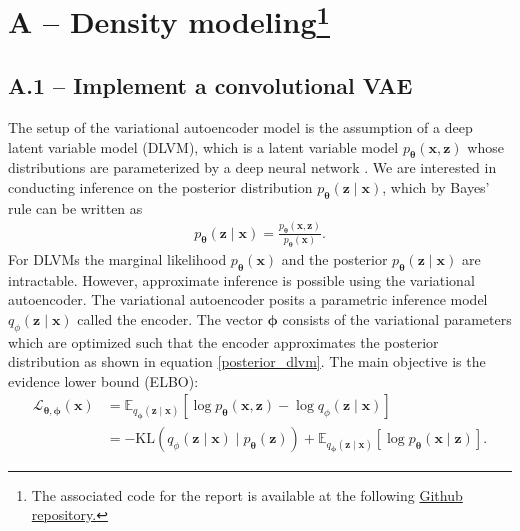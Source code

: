 \section*{A – Density modeling\footnote{The associated code for the report is available at the following \href{https://github.com/jsr-p/pmldiku-exam-paper}{Github repository.}}}

\subsection*{A.1 – Implement a convolutional VAE}
The setup of the variational autoencoder model is the assumption of 
a deep latent variable model (DLVM), which is a latent variable model 
$p_{\bm{\theta}}(\mathbf{x}, \mathbf{z})$ whose distributions are parameterized
by a deep neural network \citep{Kingma_2019}. 
We are interested in conducting inference on the posterior distribution 
$p_{\bm{\theta}}(\mathbf{z} \mid  \mathbf{x})$, which
by Bayes' rule can be written as
    \begin{align}
        \label{posterior_dlvm}
        p_{\bm{\theta}}(\mathbf{z} \mid  \mathbf{x})
        = 
    \frac{p_{\bm{\theta}}(\mathbf{x}, \mathbf{z})}{p_{\bm{\theta}}(\mathbf{x})}.
    \end{align}
For DLVMs the marginal likelihood $p_{\bm{\theta}}(\mathbf{x})$ and the posterior $p_{\bm{\theta}}(\mathbf{z} \mid  \mathbf{x})$ are intractable.
However, approximate inference is possible using the variational autoencoder. The variational autoencoder posits a parametric inference model
$q_{\phi}(\mathbf{z} \mid \mathbf{x})$ called the encoder. The vector
$\mathbf{\phi}$ consists of the variational parameters which are optimized such
that the encoder approximates the posterior distribution as shown in equation
\eqref{posterior_dlvm}. The main objective is the evidence lower bound (ELBO):  
\begin{align}
    \label{ELBO}
    \mathcal{L}_{\bm{\theta}, \bm{\phi}}(\mathbf{x})
    &= \mathbb{E}_{q_{\bm{\phi}}(\mathbf{z} \mid  \mathbf{x})} \left[
        \log p_{\bm{\theta}}(\mathbf{x}, \mathbf{z})
        - \log q_{\phi}(\mathbf{z} \mid \mathbf{x})
    \right] \\
    &= 
    - \mathrm{KL} \left( q_{\phi}(\mathbf{z} \mid \mathbf{x}) \mid  p_{\bm{\theta}}(\mathbf{z}) \right) 
    + 
    \mathbb{E}_{q_{\bm{\phi}}(\mathbf{z} \mid  \mathbf{x})} \left[
        \log p_{\bm{\theta}}(\mathbf{x} \mid  \mathbf{z})
    \right].
\end{align}

